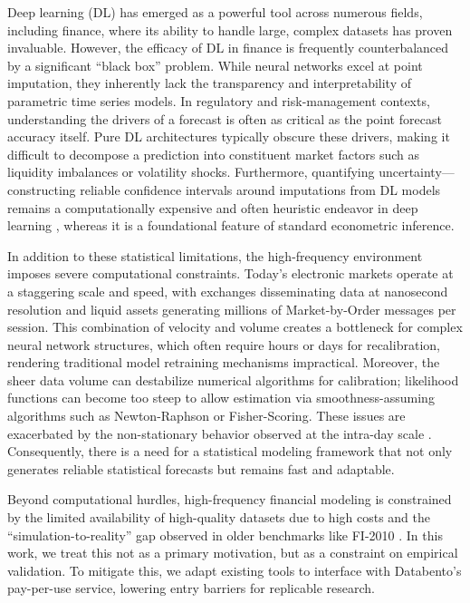 \documentclass{rQUF2e}
\theoremstyle{plain}
\theoremstyle{definition}
\theoremstyle{remark}
\begin{document}
Deep learning (DL) has emerged as a powerful tool across numerous fields, including finance, where its ability to handle large, complex datasets has proven invaluable. However, the efficacy of DL in finance is frequently counterbalanced by a significant ``black box'' problem. While neural networks excel at point imputation, they inherently lack the transparency and interpretability of parametric time series models. In regulatory and risk-management contexts, understanding the drivers of a forecast is often as critical as the point forecast accuracy itself. Pure DL architectures typically obscure these drivers, making it difficult to decompose a prediction into constituent market factors such as liquidity imbalances or volatility shocks. Furthermore, quantifying uncertainty—constructing reliable confidence intervals around imputations from DL models remains a computationally expensive and often heuristic endeavor in deep learning \citep[see][]{barber2023conformalpredictionexchangeability}, whereas it is a foundational feature of standard econometric inference.

In addition to these statistical limitations, the high-frequency environment imposes severe computational constraints. Today's electronic markets operate at a staggering scale and speed, with exchanges disseminating data at nanosecond resolution and liquid assets generating millions of Market-by-Order messages per session. This combination of velocity and volume creates a bottleneck for complex neural network structures, which often require hours or days for recalibration, rendering traditional model retraining mechanisms impractical. Moreover, the sheer data volume can destabilize numerical algorithms for calibration; likelihood functions can become too steep to allow estimation via smoothness-assuming algorithms such as Newton-Raphson or Fisher-Scoring. These issues are exacerbated by the non-stationary behavior observed at the intra-day scale \citep{dutta2023review, Vyetrenko2019GetRR}. Consequently, there is a need for a statistical modeling framework that not only generates reliable statistical forecasts but remains fast and adaptable.

Beyond computational hurdles, high-frequency financial modeling is constrained by the limited availability of high-quality datasets due to high costs \citep{KISSELL201447} and the ``simulation-to-reality'' gap observed in older benchmarks like FI-2010 \citep{prata2024lob}. In this work, we treat this not as a primary motivation, but as a constraint on empirical validation. To mitigate this, we adapt existing tools to interface with Databento's pay-per-use service, lowering entry barriers for replicable research.
\end{document}
